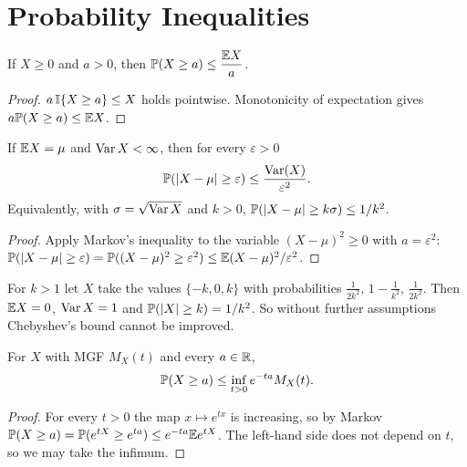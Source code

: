 \documentclass[main.tex]{subfiles}
\begin{document}
\section{Probability Inequalities}

\begin{theorem}\label{thm:markov}
If $X\ge0$ and $a>0$, then $\displaystyle\P(X\ge a)\le\frac{\E X}{a}$.
\end{theorem}
\begin{proof}
$a\,\I\{X\ge a\}\le X$ holds pointwise. Monotonicity of expectation gives $a\P(X\ge a)\le\E X$.
\end{proof}

\begin{theorem}\label{thm:chebyshev}
If $\E X=\mu$ and $\Var X<\infty$, then for every $\varepsilon>0$
\[
\P(|X - \mu| \ge \varepsilon) \le \frac{\Var(X)}{\varepsilon^2}.
\]
Equivalently, with $\sigma=\sqrt{\Var X}$ and $k>0$, $\P(|X-\mu|\ge k\sigma)\le 1/k^2$.
\end{theorem}
\begin{proof}
Apply Markov's inequality to the variable $(X-\mu)^2\ge0$ with $a=\varepsilon^2$: $\P(|X-\mu|\ge\varepsilon)=\P((X-\mu)^2\ge\varepsilon^2)\le\E(X-\mu)^2/\varepsilon^2$.
\end{proof}

\begin{example}\label{ex:chebyshev-keskin}
For $k>1$ let $X$ take the values $\{-k,0,k\}$ with probabilities $\frac{1}{2k^2},\,1-\frac1{k^2},\,\frac1{2k^2}$. Then $\E X=0$, $\Var X=1$ and $\P(|X|\ge k)=1/k^2$. So without further assumptions Chebyshev's bound cannot be improved.
\end{example}

\begin{theorem}\label{thm:chernoff}
For $X$ with MGF $M_X(t)$ and every $a\in\R$,
\[
\P(X\ge a)\le\inf_{t>0}e^{-ta}M_X(t).
\]
\end{theorem}
\begin{proof}
For every $t>0$ the map $x\mapsto e^{tx}$ is increasing, so by Markov $\P(X\ge a)=\P(e^{tX}\ge e^{ta})\le e^{-ta}\E e^{tX}$. The left-hand side does not depend on $t$, so we may take the infimum.
\end{proof}
\end{document}
